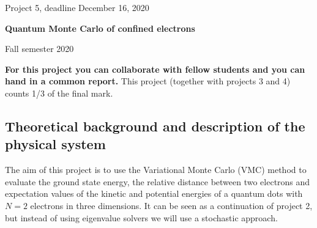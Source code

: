 \documentclass[%
oneside,                 %
final,                   %
10pt]{article}
\begin{document}

\newcommand{\exercisesection}[1]{\subsection*{#1}}






\thispagestyle{empty}

\begin{center}
{\LARGE\bf
\begin{spacing}{1.25}
Project 5, deadline  December 16, 2020
\end{spacing}
}
\end{center}


\begin{center}
{\bf Quantum Monte Carlo of confined electrons${}^{}$} \\ [0mm]
\end{center}

\begin{center}
\end{center}
    

\begin{center}
Fall semester 2020
\end{center}

\vspace{1cm}


\textbf{For this project you can collaborate with fellow students and you can  hand in a common report.}
This project (together with projects 3 and 4) counts 1/3 of the final mark.

\subsection{Theoretical background and description of the physical system}

The aim of this project is to use the Variational Monte Carlo (VMC)
method to evaluate the ground state energy, the relative distance between two electrons and
expectation values of the kinetic and potential energies of a quantum dots with $N=2$
electrons in three dimensions. It can be seen as a continuation of project 2, but instead of using eigenvalue solvers
we will use a stochastic approach.
\end{document}
